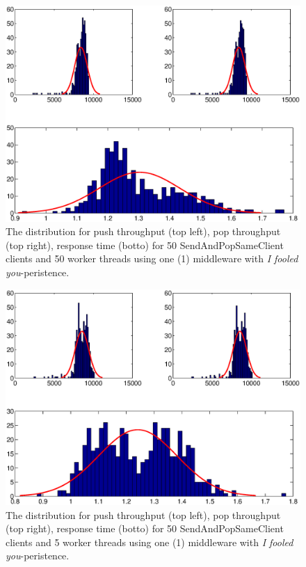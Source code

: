 \documentclass{article}
\begin{document}
        
        \begin{figure}[hbtp]
        \centering
        \includegraphics[scale=1]{img/histfit_i_fooled_you_50_thrds}
        \caption{The distribution for push throughput (top left), pop throughput (top right), response time (botto) for 50 SendAndPopSameClient clients and 50 worker threads using one (1) middleware with \textit{I fooled you}-peristence.}
        \end{figure}
        
        \begin{figure}[hbtp]
        \centering
        \includegraphics[scale=1]{img/histfit_i_fooled_you_5_thrds}
        \caption{The distribution for push throughput (top left), pop throughput (top right), response time (botto) for 50 SendAndPopSameClient clients and 5 worker threads using one (1) middleware with \textit{I fooled you}-peristence.}
        \end{figure}
        
\end{document}
